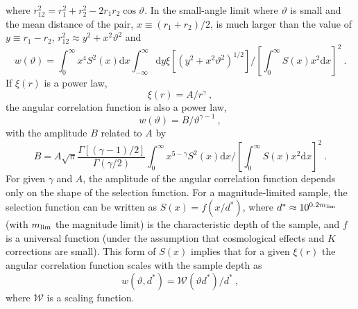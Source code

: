 \documentclass[12pt,a4paper]{article}
\newcommand{\dif}{\mathrm{d}}
\begin{document}
where $r_{12}^2 = r_1^2 + r_2^2 - 2r_1 r_2 \cos \vartheta$. In the small-angle limit where $\vartheta$ is small and the mean distance of the pair, $x \equiv (r_1 +r_2)/2$, is much larger than the value of $y \equiv r_1 -r_2$, $r_{12}^2 \approx y^2 +x^2 \vartheta^2$ and 
\begin{equation}
w(\vartheta) = \int_0^\infty x^4 S^2(x) \dif x \int_{-\infty}^\infty \dif y \xi \left[(y^2 +x^2 \vartheta^2)^{1/2} \right] \Bigg/ \left[\int_0^\infty S(x) x^2 \dif x \right]^2 ~.
\end{equation}
If $\xi(r)$ is a power law,
\begin{equation}
\xi(r) = A/r^\gamma ~,
\end{equation}
the angular correlation function is also a power law,
\begin{equation}
w(\vartheta) = B/\vartheta^{\gamma -1} ~,
\end{equation}
with the amplitude $B$ related to $A$ by
\begin{equation}
B = A \sqrt{\pi} \dfrac{\Gamma[(\gamma-1)/2]}{\Gamma(\gamma/2)} \int_0^\infty x^{5-\gamma} S^2(x) \dif x \Bigg/ \left[\int_0^\infty S(x) x^2 \dif x \right]^2 ~.
\end{equation}
For given $\gamma$ and $A$, the amplitude of the angular correlation function depends only on the shape of the selection function. For a magnitude-limited sample, the selection function can be written as $S(x) = f(x/d^\ast)$, where $d^\ast \approx 10^{0.2 m_{\rm lim}}$ (with $m_{\rm lim}$ the magnitude limit) is the characteristic depth of the sample, and $f$ is a universal function (under the assumption that cosmological effects and $K$ corrections are small). This form of $S(x)$ implies that for a given $\xi(r)$ the angular correlation function scales with the sample depth as
\begin{equation}
w(\vartheta, d^\ast) = \mathscr W(\vartheta d^\ast)/d^\ast ~,
\end{equation}
where $\mathscr W$ is a scaling function.
\end{document}
